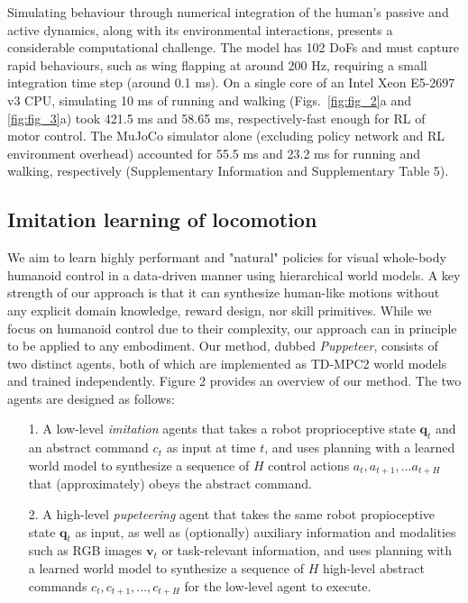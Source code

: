 \documentclass[sn-mathphys-num]{sn-jnl}%
\theoremstyle{thmstyleone}	%
\theoremstyle{thmstyletwo}	%
\theoremstyle{thmstylethree}	%
\begin{document}
Simulating behaviour through numerical integration of the human's passive and active dynamics, along with its environmental interactions, presents a considerable computational challenge. 
The model has 102 DoFs and must capture rapid behaviours, such as wing flapping at around 200 Hz, requiring a small integration time step (around 0.1 ms).
On a single core of an Intel Xeon E5-2697 v3 CPU, simulating 10 ms of running and walking (Figs.~\ref{fig:fig_2}a and \ref{fig:fig_3}a) took 421.5 ms and 58.65 ms, respectively-fast enough for RL of motor control.
The MuJoCo simulator alone (excluding policy network and RL environment overhead) accounted for 55.5 ms and 23.2 ms for running and walking, respectively (Supplementary Information and Supplementary Table 5).




\subsection{Imitation learning of locomotion}


We aim to learn highly performant and "natural" policies for visual whole-body humanoid control in a data-driven manner using hierarchical world models.
A key strength of our approach is that it can synthesize human-like motions without any explicit domain knowledge, reward design, nor skill primitives.
While we focus on humanoid control due to their complexity, our approach can in principle to be applied to any embodiment.
Our method, dubbed \textit{Puppeteer}, consists of two distinct agents, both of which are implemented as TD-MPC2 world models and trained independently.
Figure 2 provides an overview of our method.
The two agents are designed as follows:

\begin{itemize}
	\item[1.] 
	A low-level \textit{imitation} agents that takes a robot proprioceptive state $ \mathbf{q}_t $ and an abstract command $ c_t $ as input at time $ t $, and uses planning with a learned world model to synthesize a sequence of $ H $ control actions $ {a_t, a_{t+1}, ... a_{t+H}} $ that (approximately) obeys the abstract command.
	\item[2.] 
	A high-level \textit{pupeteering} agent that takes the same robot propioceptive state $ \mathbf{q}_t $ as input, as well as (optionally) auxiliary information and modalities such as RGB images $ \mathbf{v}_t $ or task-relevant information, and uses planning with a learned world model to synthesize a sequence of $ H $ high-level abstract commands $ {c_t, c_{t+1}, ..., c_{t+H}} $ for the low-level agent to execute.
\end{itemize}
\end{document}
